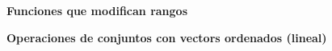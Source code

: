 \textbf{Funciones que modifican rangos}


\textbf{Operaciones de conjuntos con vectors ordenados (lineal)}

